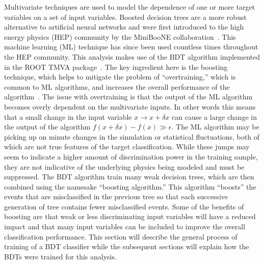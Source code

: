 Multivariate techniques are used to model the dependence of one or more target variables on a set of input variables.
Boosted decision trees are a more robust alternative to artificial neural networks and were first introduced to the high energy physics (HEP) community by the MiniBooNE collaboration~\cite{Roe:2004na}.
This machine learning (ML) technique has since been used countless times throughout the HEP community.
This analysis makes use of the BDT algorithm implemented in the ROOT TMVA package~\cite{1742-6596-219-3-032057}.
The key ingredient here is the boosting technique, which helps to mitigate the problem of ``overtraining,'' which is common to ML algorithms, and increases the overall performance of the algorithm~\cite{Hocker:2007ht}.
The issue with overtraining is that the output of the ML algorithm becomes overly dependent on the multivariate inputs.
In other words this means that a small change in the input variable $x{\rightarrow}x+\delta{x}$ can cause a large change in the output of the algorithm $f\left(x+\delta{x}\right)-f\left(x\right)\gg\epsilon$.
The ML algorithm may be picking up on minute changes in the simulation or statistical fluctuations, both of which are not true features of the target classification.
While these jumps may seem to indicate a higher amount of discrimination power in the training sample, they are not indicative of the underlying physics being modeled and must be suppressed.
The BDT algorithm train many weak decision trees, which are then combined using the namesake ``boosting algorithm.''
This algorithm ``boosts'' the events that are misclassified in the previous tree so that each successive generation of tree contains fewer misclassified events.
Some of the benefits of boosting are that weak or less discriminating input variables will have a reduced impact and that many input variables can be included to improve the overall classification performance.
This section will describe the general process of training of a BDT classifier while the subsequent sections will explain how the BDTs were trained for this analysis.

